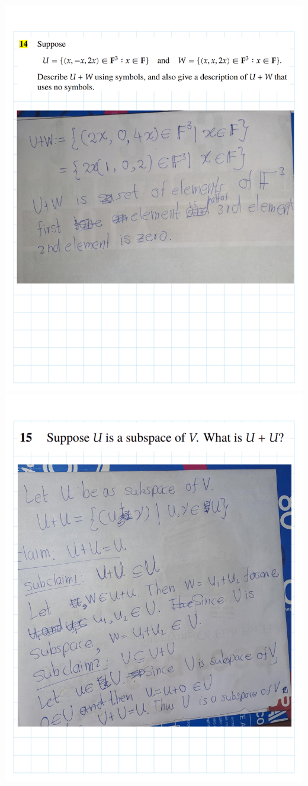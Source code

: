\documentclass[
]{book}
\theoremstyle{definition}
\theoremstyle{definition}
\theoremstyle{definition}
\theoremstyle{definition}
\theoremstyle{remark}
\begin{document}
\begin{enumerate}
  \includegraphics{fig/Ex1C/Ex/Ex-16.png} \includegraphics{fig/Ex1C/Ex/Ex-17.png}

\end{enumerate}
\end{document}
